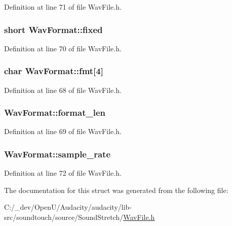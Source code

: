 Definition at line 71 of file Wav\+File.\+h.

\subsubsection[{\texorpdfstring{fixed}{fixed}}]{\setlength{\rightskip}{0pt plus 5cm}short Wav\+Format\+::fixed}\hypertarget{struct_wav_format_a77ecdf86ba6abc9661c1e61486b664db}{}\label{struct_wav_format_a77ecdf86ba6abc9661c1e61486b664db}


Definition at line 70 of file Wav\+File.\+h.

\subsubsection[{\texorpdfstring{fmt}{fmt}}]{\setlength{\rightskip}{0pt plus 5cm}char Wav\+Format\+::fmt\mbox{[}4\mbox{]}}\hypertarget{struct_wav_format_a1594d23ce05ea2ce07d97d07e4f38832}{}\label{struct_wav_format_a1594d23ce05ea2ce07d97d07e4f38832}


Definition at line 68 of file Wav\+File.\+h.

\subsubsection[{\texorpdfstring{format\+\_\+len}{format_len}}]{ Wav\+Format\+::format\+\_\+len}\hypertarget{struct_wav_format_a6b24ac462dd0d59b5f5e3dc297afc8bd}{}\label{struct_wav_format_a6b24ac462dd0d59b5f5e3dc297afc8bd}


Definition at line 69 of file Wav\+File.\+h.

\subsubsection[{\texorpdfstring{sample\+\_\+rate}{sample_rate}}]{ Wav\+Format\+::sample\+\_\+rate}\hypertarget{struct_wav_format_a29fa19c2baf150fbdd70d10d13390c1e}{}\label{struct_wav_format_a29fa19c2baf150fbdd70d10d13390c1e}


Definition at line 72 of file Wav\+File.\+h.



The documentation for this struct was generated from the following file\+:\begin{DoxyCompactItemize}
\item 
C\+:/\+\_\+dev/\+Open\+U/\+Audacity/audacity/lib-\/src/soundtouch/source/\+Sound\+Stretch/\hyperlink{_wav_file_8h}{Wav\+File.\+h}\end{DoxyCompactItemize}
